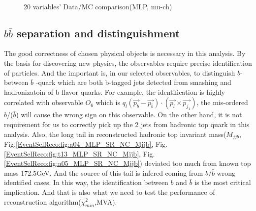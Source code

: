 			\begin{figure}[H]
			\centering
			    \\
			\label{EventSelReco:fig:a05_DataMC_vars}
			\caption{20 variables' Data/MC comparison(MLP, mu-ch)}
			\end{figure}
			\FloatBarrier

	\subsection{$b\bar{b}$ separation and distinguishment}
	\label{ssec:bbsep}

		The good correctness of chosen physical objects is necessary in this analysis. By the basis for discovering new physics, the observables require precise identification of particles. And the important is, in our selected observables, to distinguish $b$- between $\bar{b}$ -quark which are both b-tagged jets detected from smashing and hadronizatoin of b-flavor quarks. For example, the identification is highly correlated with observable $O_{6}$ which is $q_{l}(\vec{p_{b}}-\vec{p_{\bar{b}}})\cdot(\vec{p_{l}}\times\vec{p_{j_{1}}})$, the mis-ordered $b$/($\bar{b}$) will cause the wrong sign on this observable. On the other hand, it is not requirement for us to correctly pick up the 2 jets from hadronic top quark in this analysis. Also, the long tail in reconstructed hadronic top invariant mass($M_{jjb}$, Fig.\ref{EventSelReco:fig:a04_MLP_SR_NC_Mjjb}, Fig.\ref{EventSelReco:fig:t13_MLP_SR_NC_Mjjb}, Fig.\ref{EventSelReco:fig:a05_MLP_SR_NC_Mjjb}) deviated too much from known top mass 172.5GeV. And the source of this tail is infered coming from $b/\bar{b}$ wrong identified cases. In this way, the identification between $b$ and $\bar{b}$ is the most critical implication. And that is also what we need to test the performance of reconstruction algorithm($\chi^2_{min}$,MVA). 


